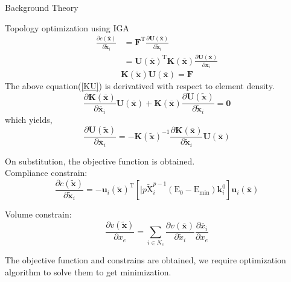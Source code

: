 \documentclass[a4paper,12pt,times]{article}
\begin{document}
\begin{section}{Background Theory}
\begin{subsection}{Topology optimization using IGA}
\begin{equation}
\begin{aligned}
\frac{\partial c(\overline{\mathbf{x}})}{\partial \tilde{\mathbf{x}}_{i}} &=\mathbf{F}^{\mathrm{T}} \frac{\partial \mathbf{U}(\overline{\mathbf{x}})}{\partial \tilde{\mathbf{x}}_{i}} \\
&=\mathbf{U}(\overline{\mathbf{x}})^{\mathrm{T}} \mathbf{K}(\overline{\mathbf{x}}) \frac{\partial \mathbf{U}(\overline{\mathbf{x}})}{\partial \overline{\mathbf{x}}_{i}}
\end{aligned}
\end{equation}
\begin{equation}\label{KU}
\mathbf{K}(\tilde{\mathbf{x}}) \mathbf{U}(\overline{\mathbf{x}})=\mathbf{F}
\end{equation}
The above equation(\ref{KU}) is derivatived with respect to element density.
\begin{equation}
\frac{\partial \mathbf{K}(\overline{\mathbf{x}})}{\partial \overline{\mathbf{x}}_{i}} \mathbf{U}(\overline{\mathbf{x}})+\mathbf{K}(\overline{\mathbf{x}}) \frac{\partial \mathbf{U}(\tilde{\mathbf{x}})}{\partial \tilde{\mathbf{x}}_{i}}=\mathbf{0}
\end{equation}
which yields,
\begin{equation}
\frac{\partial \mathbf{U}(\tilde{\mathbf{x}})}{\partial \overline{\mathbf{x}}_{i}}=-\mathbf{K}(\tilde{\mathbf{x}})^{-1} \frac{\partial \mathbf{K}(\overline{\mathbf{x}})}{\partial \tilde{\mathbf{x}}_{i}} \mathbf{U}(\overline{\mathbf{x}})
\end{equation}

On substitution, the objective function is obtained.\\
Compliance constrain:
\begin{equation}
\frac{\partial c(\tilde{\mathbf{x}})}{\partial \tilde{\mathbf{x}}_{i}}=-\mathbf{u}_{i}(\tilde{\mathbf{x}})^{\mathrm{T}}\left[\mid p \tilde{\mathrm{X}}_{i}^{p-1}\left(\mathrm{E}_{0}-\mathrm{E}_{\min }\right) \mathbf{k}_{i}^{0}\right] \mathbf{u}_{i}(\overline{\mathbf{x}})
\end{equation}

Volume constrain:
\begin{equation}
\frac{\partial v(\tilde{\mathbf{x}})}{\partial x_{e}}=\sum_{i \in N_{e}} \frac{\partial v(\overline{\mathbf{x}})}{\partial \tilde{x}_{i}} \frac{\partial \bar{x}_{i}}{\partial x_{e}}
\end{equation}

The objective function and constrains are obtained, we require optimization algorithm to solve them to get minimization. 

\end{subsection}
\end{section}
\end{document}
